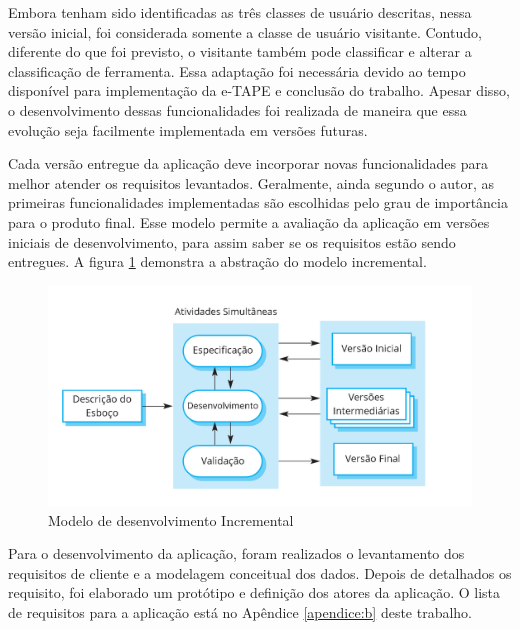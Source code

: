 \par
Embora tenham sido identificadas as três classes de usuário descritas, nessa versão inicial, foi considerada somente a classe de usuário visitante.
Contudo, diferente do que foi previsto, o visitante também pode classificar e alterar a classificação de ferramenta. Essa adaptação foi necessária devido ao tempo disponível 
para implementação da e-TAPE e conclusão do trabalho. Apesar disso, o desenvolvimento dessas funcionalidades foi realizada de maneira que essa evolução seja facilmente 
implementada em versões futuras.

\par
Cada versão entregue da aplicação deve incorporar novas funcionalidades para melhor atender os requisitos levantados. Geralmente, ainda segundo o autor, as primeiras funcionalidades
implementadas são escolhidas pelo grau de importância para o produto final. Esse modelo permite a avaliação da aplicação em versões iniciais de desenvolvimento, para assim saber 
se os requisitos estão sendo entregues. A figura \ref{fig:modelo-incremental} demonstra a abstração do modelo incremental.

\begin{figure}[!ht]
    \centering
    \includegraphics[scale=0.20]{./figuras/modelo_incremental.png}
    \caption{Modelo de desenvolvimento Incremental }
    \label{fig:modelo-incremental}
\end{figure}

\par
Para o desenvolvimento da aplicação, foram realizados o levantamento dos requisitos de cliente e a modelagem conceitual dos dados.
Depois de detalhados os requisito, foi elaborado um protótipo e definição dos atores da aplicação. O lista de requisitos para a aplicação está no Apêndice \ref{apendice:b} deste trabalho. 

